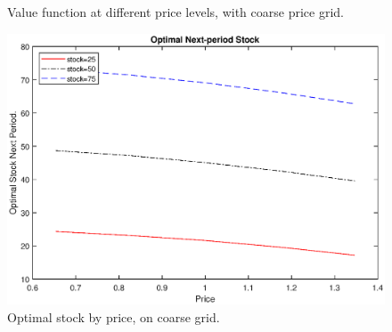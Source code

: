 \documentclass[12pt,a4paper]{article}
\begin{document}
\begin{enumerate}[1.]
\begin{figure}[h]
\caption{Value function at different price levels, with coarse price grid.}
\end{figure}
\begin{figure}[h]
\includegraphics[width=\textwidth]{stock2.eps}\vspace{-3ex}
\caption{Optimal stock by price, on coarse grid.}

\end{figure}
\restoregeometry
\end{enumerate}
\end{document}
